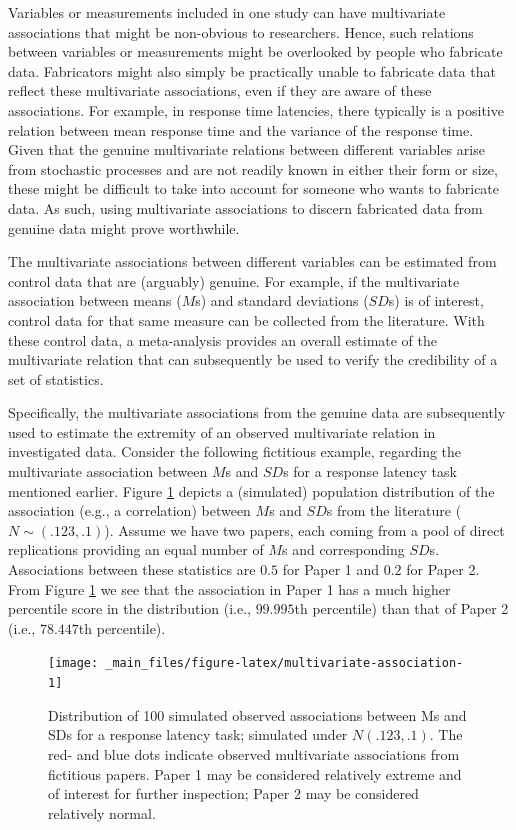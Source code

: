 \documentclass[a5paper]{book}
\begin{document}
Variables or measurements included in one study can have multivariate
associations that might be non-obvious to researchers. Hence, such
relations between variables or measurements might be overlooked by
people who fabricate data. Fabricators might also simply be practically
unable to fabricate data that reflect these multivariate associations,
even if they are aware of these associations. For example, in response
time latencies, there typically is a positive relation between mean
response time and the variance of the response time. Given that the
genuine multivariate relations between different variables arise from
stochastic processes and are not readily known in either their form or
size, these might be difficult to take into account for someone who
wants to fabricate data. As such, using multivariate associations to
discern fabricated data from genuine data might prove worthwhile.

The multivariate associations between different variables can be
estimated from control data that are (arguably) genuine. For example, if
the multivariate association between means (\(M\)s) and standard
deviations (\(SD\)s) is of interest, control data for that same measure
can be collected from the literature. With these control data, a
meta-analysis provides an overall estimate of the multivariate relation
that can subsequently be used to verify the credibility of a set of
statistics.

Specifically, the multivariate associations from the genuine data are
subsequently used to estimate the extremity of an observed multivariate
relation in investigated data. Consider the following fictitious
example, regarding the multivariate association between \(M\)s and
\(SD\)s for a response latency task mentioned earlier. Figure
\ref{fig:multivariate-association} depicts a (simulated) population
distribution of the association (e.g., a correlation) between \(M\)s and
\(SD\)s from the literature (\(N\sim(.123, .1)\)). Assume we have two
papers, each coming from a pool of direct replications providing an
equal number of \(M\)s and corresponding \(SD\)s. Associations between
these statistics are \(0.5\) for Paper 1 and \(0.2\) for Paper 2. From
Figure \ref{fig:multivariate-association} we see that the association in
Paper 1 has a much higher percentile score in the distribution (i.e.,
\(99.995\)th percentile) than that of Paper 2 (i.e., \(78.447\)th
percentile).

\begin{figure}

{\centering \texttt{[image: \_main\_files/figure-latex/multivariate-association-1]} 

}

\caption{Distribution of 100 simulated observed associations between Ms and SDs for a response latency task; simulated under $N(.123,.1)$. The red- and blue dots indicate observed multivariate associations from fictitious papers. Paper 1 may be considered relatively extreme and of interest for further inspection; Paper 2 may be considered relatively normal.}\label{fig:multivariate-association}
\end{figure}
\end{document}
